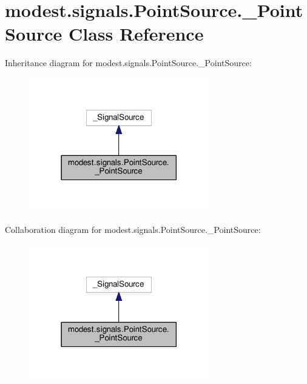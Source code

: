 \hypertarget{classmodest_1_1signals_1_1PointSource_1_1__PointSource}{}\section{modest.\+signals.\+Point\+Source.\+\_\+\+Point\+Source Class Reference}
\label{classmodest_1_1signals_1_1PointSource_1_1__PointSource}


Inheritance diagram for modest.\+signals.\+Point\+Source.\+\_\+\+Point\+Source\+:
\nopagebreak
\begin{figure}[H]
\begin{center}
\leavevmode
\includegraphics[width=222pt]{classmodest_1_1signals_1_1PointSource_1_1__PointSource__inherit__graph}
\end{center}
\end{figure}


Collaboration diagram for modest.\+signals.\+Point\+Source.\+\_\+\+Point\+Source\+:
\nopagebreak
\begin{figure}[H]
\begin{center}
\leavevmode
\includegraphics[width=222pt]{classmodest_1_1signals_1_1PointSource_1_1__PointSource__coll__graph}
\end{center}
\end{figure}
